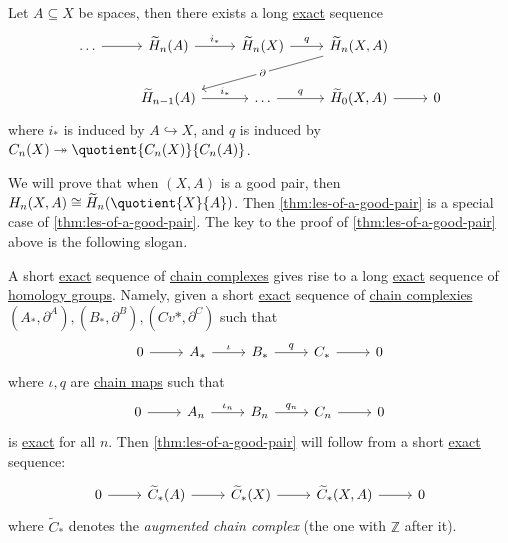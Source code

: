 \begin{theorem}\label{thm:long-exact-sequence-of-a-pair}
	Let $A \subseteq X$ be spaces, then there exists a long \hyperref[def:exact]{exact} sequence
	\[\begin{tikzcd}
			{\ldots} & {\widetilde{H}_n(A)} & {\widetilde{H}_n(X)} & {\widetilde{H}_n(X, A)} \\
			& {\widetilde{H}_{n-1}(A)} & \ldots & {\widetilde{H}_{0}(X, A)} & 0
			\arrow[from=1-1, to=1-2]
			\arrow["{i_\ast}", from=1-2, to=1-3]
			\arrow["q", from=1-3, to=1-4]
			\arrow[from=2-4, to=2-5]
			\arrow["{q}", from=2-3, to=2-4]
			\arrow["{i_\ast}", from=2-2, to=2-3]
			\arrow["{\partial}"{description}, from=1-4, to=2-2]
		\end{tikzcd}\]
	where \(i_\ast\) is induced by \(A\hookrightarrow X\), and \(q\) is induced by \(C_{n} (X)\twoheadrightarrow \quotient{C_{n} (X)}{C_{n} (A)}\).
\end{theorem}
We will prove that when $(X, A)$ is a good pair, then $H_n(X, A) \cong \widetilde{H}_n(\quotient{X}{A})$. Then \autoref{thm:les-of-a-good-pair}
is a special case of \autoref{thm:les-of-a-good-pair}. The key to the proof of \autoref{thm:les-of-a-good-pair} above is the following slogan.

\begin{remark}
	A short \hyperref[def:exact]{exact} sequence of \hyperref[def:chain-complex]{chain complexes} gives rise to a long \hyperref[def:exact]{exact} sequence
	of \hyperref[def:homology-group]{homology groups}. Namely, given a short \hyperref[def:exact]{exact} sequence of \hyperref[def:chain-complex]{chain complexies}
	\((A_\ast, \partial^A), (B_\ast, \partial^B), (Cv\ast, \partial^C)\) such that
	\[\begin{tikzcd}
			0 & {A_\ast} & {B_\ast} & {C_\ast} & 0
			\arrow[from=1-1, to=1-2]
			\arrow["\iota", from=1-2, to=1-3]
			\arrow["q", from=1-3, to=1-4]
			\arrow[from=1-4, to=1-5]
		\end{tikzcd}\]
	where \(\iota , q\) are \hyperref[def:chain-map]{chain maps} such that
	\[\begin{tikzcd}
			0 & {A_n} & {B_n} & {C_n} & 0
			\arrow[from=1-1, to=1-2]
			\arrow["\iota_{n}", from=1-2, to=1-3]
			\arrow["q_{n}", from=1-3, to=1-4]
			\arrow[from=1-4, to=1-5]
		\end{tikzcd}\]
	is \hyperref[def:exact]{exact} for all \(n\).
	Then \autoref{thm:les-of-a-good-pair} will
	follow from a short \hyperref[def:exact]{exact} sequence:
	\[\begin{tikzcd}
			0 & {\widetilde{C}_\ast(A)} & {\widetilde{C}_\ast(X)} & {\widetilde{C}_\ast(X, A)} & 0
			\arrow[from=1-1, to=1-2]
			\arrow[from=1-2, to=1-3]
			\arrow[from=1-3, to=1-4]
			\arrow[from=1-4, to=1-5]
		\end{tikzcd}\]
	where $\widetilde{C}_\ast$ denotes the \emph{augmented chain complex} (the one with $\mathbb{Z}$ after it).
\end{remark}

